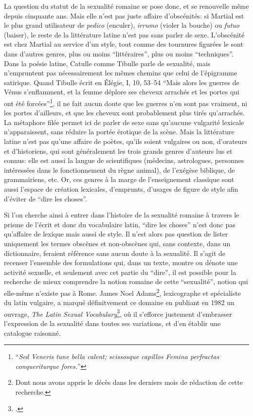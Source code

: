 La question du statut de la sexualité romaine se pose donc, et se renouvelle même depuis cinquante ans. Mais elle n'est pas juste affaire d'obscénités: si Martial est le plus grand utilisateur de \textit{pedico} (enculer), \textit{irrumo} (violer la bouche) ou \textit{futuo} (baiser), le reste de la littérature latine n'est pas sans parler de sexe. L'obscénité est chez Martial au service d'un style, tout comme des tournures figurées le sont dans d'autres genres, plus ou moins \enquote{littéraires}, plus ou moins \enquote{techniques}. Dans la poésie latine, Catulle comme Tibulle parle de sexualité, mais n'empruntent pas nécessairement les mêmes chemins que celui de l'épigramme satirique. Quand Tibulle écrit en Élégie, I, 10, 53--54 \enquote{Mais alors les guerres de Vénus s'enflamment, et la femme déplore ses cheveux arrachés et les portes qui ont été forcées}\footnote{\enquote{\textit{Sed Veneris tune bella calent; scissosque capillos Femina perfractas conqueriturque fores.}}}, il ne fait aucun doute que les guerres n'en sont pas vraiment, ni les portes d'ailleurs, et que les cheveux sont probablement plus tirés qu'arrachés. La métaphore filée permet ici de parler de sexe sans qu'aucune vulgarité lexicale n'apparaissent, sans réduire la portée érotique de la scène. Mais la littérature latine n'est pas qu'une affaire de poètes, qu'ils soient vulgaires ou non, d'orateurs et d'historiens, qui sont généralement les trois grands genres d'auteurs lus et connus: elle est aussi la langue de scientifiques (médecins, astrologues, personnes intéressées dans le fonctionnement du règne animal), de l'exégèse biblique, de grammairiens, etc. Or, ces genres à la marge de l'enseignement classique sont aussi l'espace de création lexicales, d'emprunts, d'usages de figure de style afin d'éviter de \enquote{dire les choses}.

Si l'on cherche ainsi à entrer dans l'histoire de la sexualité romaine à travers le prisme de l'écrit et donc du vocabulaire latin, \enquote{dire les choses} n'est donc pas qu'affaire de lexique mais aussi de style. Il n'est alors pas question de lister uniquement les termes obscènes et non-obscènes qui, sans contexte, dans un dictionnaire, feraient référence sans aucun doute à la sexualité. Il s'agit de recenser l'ensemble des formulations qui, dans un texte, montre ou dénote une activité sexuelle, et seulement avec cet partie du \enquote{dire}, il est possible pour la recherche de mieux comprendre la notion romaine de cette \enquote{sexualité}, notion qui elle-même n'existe pas à Rome. James Noel Adams\footnote{Dont nous avons appris le décès dans les derniers mois de rédaction de cette recherche.}, lexicographe et spécialiste du latin vulgaire, a marqué définitvement ce domaine en publiant en 1982 un ouvrage, \textit{The Latin Sexual Vocabulary}\footcite{adams}, où il s'efforce justement d'embrasser l'expression de la sexualité dans toutes ses variations, et d'en établir une catalogue raisonné.

